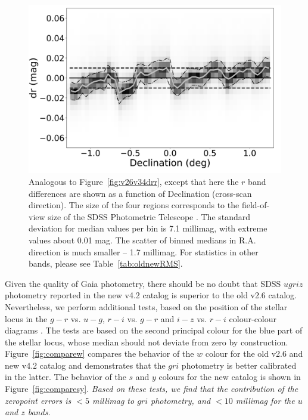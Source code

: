 \documentclass[fleqn,usenatbib]{mnras}
\begin{document}
\begin{figure}
    \centering\includegraphics[width=0.95\columnwidth]{figures/testV26vsV42_r_dr_Dec_Hess.png} 
\caption{Analogous to Figure~\ref{fig:v26v34drr}, except that here the $r$ band
differences are shown as a function of Declination (cross-scan direction). The size 
of the four regions corresponds to the field-of-view size of the SDSS Photometric Telescope \citep{2006AN....327..821T}. 
The standard deviation for median values per bin is 7.1 millimag, with extreme values about 
0.01 mag. The scatter of binned medians in R.A. direction is much smaller -- 1.7 millimag. 
For statistics in other bands, please see Table~\ref{tab:oldnewRMS}.}
\label{fig:v26v34drDec}
\end{figure}
 

Given the quality of Gaia photometry, there should be no doubt that SDSS $ugriz$ photometry
reported in the new v4.2 catalog is superior to the old v2.6 catalog. Nevertheless, we perform
additional tests, based on the position of the stellar locus in the $g-r$ vs. $u-g$, $r-i$ vs. $g-r$ 
and $i-z$ vs. $r-i$ colour-colour diagrams  \citep{2004AN....325..583I}. The tests are based
on the second principal colour for the blue part of the stellar locus, whose median should 
not deviate from zero by construction. Figure~\ref{fig:comparew} compares the behavior
of the $w$ colour for the old v2.6 and new v4.2 catalog and demonstrates that the $gri$
photometry is better calibrated in the latter. The behavior of the $s$ and $y$ colours for the 
new catalog is shown in Figure~\ref{fig:comparesy}. {\it Based on these tests, we find that 
the contribution of the zeropoint errors is $<5$ millimag to $gri$ photometry, and 
$<10$ millimag for the $u$ and $z$ bands.} 
\end{document}
